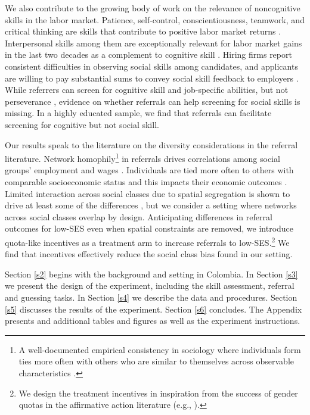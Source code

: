 \documentclass[11pt,a4paper,oneside]{article}
\begin{document}
We also contribute to the growing body of work on the relevance of noncognitive skills in the labor market. Patience, self-control, conscientiousness, teamwork, and critical thinking are skills that contribute to positive labor market returns \citep{heckman2006effects,lindqvist2011labor,heckman2012hard,weinberger2014increasing}. Interpersonal skills among them are exceptionally relevant for labor market gains in the last two decades as a complement to cognitive skill \citep{deming2017growing,deming2023multidimensional}. Hiring firms report consistent difficulties in observing social skills among candidates, and applicants are willing to pay substantial sums to convey social skill feedback to employers \citep{bassi2022screening}. While referrers can screen for cognitive skill and job-specific abilities, but not perseverance \citep{beaman_who_2012,beaman_job_2018,pallais_why_2016}, evidence on whether referrals can help screening for social skills is missing. In a highly educated sample, we find that referrals can facilitate screening for cognitive but not social skill.

Our results speak to the literature on the diversity considerations in the referral literature. Network homophily\footnote{A well-documented empirical consistency in sociology where individuals form ties more often with others who are similar to themselves across observable characteristics \citep{mcpherson2001birds,mcpherson2006social}.} in referrals drives correlations among social groups' employment and wages \citep{calvo2004effects,calvo2007networks}. Individuals are tied more often to others with comparable socioeconomic status and this impacts their economic outcomes \citep{chetty2022social_a}. Limited interaction across social classes due to spatial segregation is shown to drive at least some of the differences \citep{chetty2022social_b}, but we consider a setting where networks across social classes overlap by design. Anticipating differences in referral outcomes for low-SES even when spatial constraints are removed, we introduce quota-like incentives as a treatment arm to increase referrals to low-SES.\footnote{We design the treatment incentives in inspiration from the success of gender quotas in the affirmative action literature (e.g., \citet{bertrand2019breaking, balafoutas2012affirmative, niederle2013costly}).} We find that incentives effectively reduce the social class bias found in our setting.

Section \ref{s2} begins with the background and setting in Colombia. In Section \ref{s3} we present the design of the experiment, including the skill assessment, referral and guessing tasks. In Section \ref{s4} we describe the data and procedures. Section \ref{s5} discusses the results of the experiment. Section \ref{s6} concludes. The Appendix presents and additional tables and figures as well as the experiment instructions.
\end{document}
